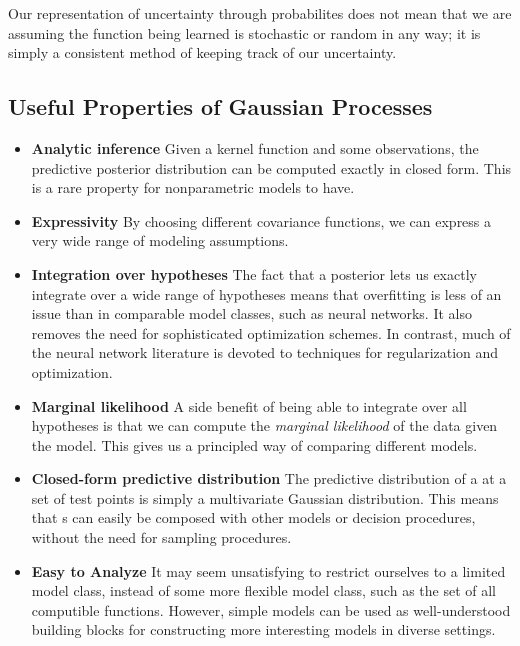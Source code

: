 Our representation of uncertainty through probabilites does not mean that we are assuming the function being learned is stochastic or random in any way; it is simply a consistent method of keeping track of our uncertainty.





\subsection{Useful Properties of Gaussian Processes}

\begin{itemize}

\item {\bf Analytic inference}
Given a kernel function and some observations, the predictive posterior distribution can be computed exactly in closed form.  This is a rare property for nonparametric models to have.

\item {\bf Expressivity}
By choosing different covariance functions, we can express a very wide range of modeling assumptions.

\item {\bf Integration over hypotheses}
The fact that a \gp{} posterior lets us exactly integrate over a wide range of hypotheses means that overfitting is less of an issue than in comparable model classes, such as neural networks.
It also removes the need for sophisticated optimization schemes.
%
In contrast, much of the neural network literature is devoted to techniques for regularization and optimization.

\item {\bf Marginal likelihood}
A side benefit of being able to integrate over all hypotheses is that we can compute the \emph{marginal likelihood} of the data given the model.
This gives us a principled way of comparing different models.

\item {\bf Closed-form predictive distribution}
The predictive distribution of a \gp{} at a set of test points is simply a multivariate Gaussian distribution.
This means that \gp{}s can easily be composed with other models or decision procedures, without the need for sampling procedures.

\item {\bf Easy to Analyze}
It may seem unsatisfying to restrict ourselves to a limited model class, instead of some more flexible model class, such as the set of all computible functions.
However, simple models can be used as well-understood building blocks for constructing more interesting models in diverse settings.


\end{itemize}
